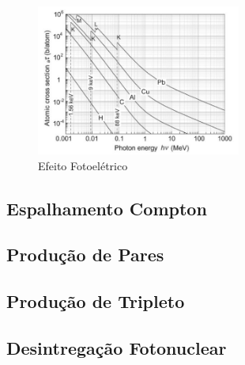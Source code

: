 \documentclass[11pt,a4paper]{article}
\begin{document}
            \begin{figure}[h]
                \centering
                \includegraphics[width=0.6\textwidth]{Imagens/descontinuidadeEfeitoFotoeletrico.JPG}
                \caption{Efeito Fotoelétrico}
                \label{fig:descontinuidadeEfeitoFotoeletrico}
            \end{figure}

        \subsection{Espalhamento Compton}

        \subsection{Produção de Pares}

        \subsection{Produção de Tripleto}

        \subsection{Desintregação Fotonuclear}

        


\end{document}

